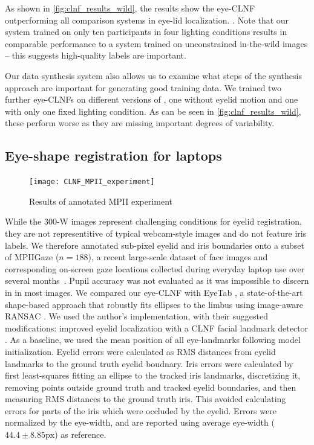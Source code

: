 As shown in \autoref{fig:clnf_results_wild}, the results show the eye-CLNF outperforming all comparison systems in eye-lid localization. . Note that our system trained on only ten participants in four lighting conditions results in comparable performance to a system trained on unconstrained in-the-wild images -- this suggests high-quality labels are important.

Our data synthesis system also allows us to examine what steps of the synthesis approach are important for generating good training data. We trained two further eye-CLNFs on different versions of \dataset, one without eyelid motion and one with only one fixed lighting condition. As can be seen in \autoref{fig:clnf_results_wild}, these perform worse as they are missing important degrees of variability.

\subsection{Eye-shape registration for laptops}

\begin{figure}
    \centering
    \texttt{[image: CLNF\_MPII\_experiment]}
    \caption{Results of annotated MPII experiment}
    \label{fig:clnf_results_MPII}
\end{figure}



While the 300-W images represent challenging conditions for eyelid registration, they are not representitive of typical webcam-style images and do not feature iris labels.
We therefore annotated sub-pixel eyelid and iris boundaries onto a subset of MPIIGaze ($n\!=\!188$), a recent large-scale dataset of face images and corresponding on-screen gaze locations collected during everyday laptop use over several months~\cite{zhang15_cvpr}.
Pupil accuracy was not evaluated as it was impossible to discern in in most images.
We compared our eye-CLNF with EyeTab \cite{wood2014eyetab}, a state-of-the-art shape-based approach that robustly fits ellipses to the limbus using image-aware RANSAC \cite{swirski2012robust}.
We used the author's implementation, with their suggested modifications: improved eyelid localization with a CLNF facial landmark detector \cite{baltrusaitis2013constrained}.
As a baseline, we used the mean position of all eye-landmarks following model initialization.
Eyelid errors were calculated as RMS distances from eyelid landmarks to the ground truth eyelid boudnary.
Iris errors were calculated by first least-squares fitting an ellipse to the tracked iris landmarks, discretizing it, removing points outside ground truth and tracked eyelid boundaries, and then measuring RMS distances to the ground truth iris.
This avoided calculating errors for parts of the iris which were occluded by the eyelid.
Errors were normalized by the eye-width, and are reported using average eye-width ($44.4\!\pm\!8.85\textrm{px}$) as reference.


